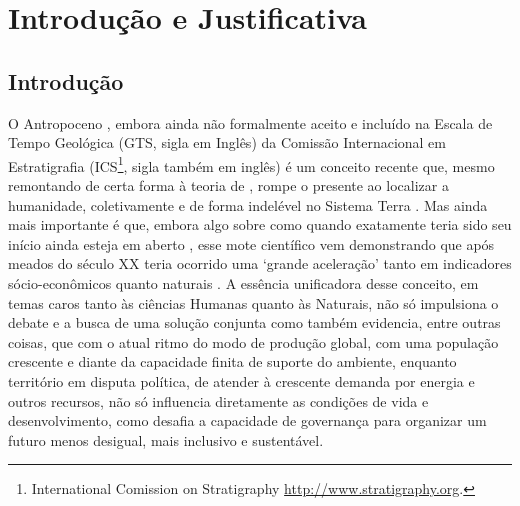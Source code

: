 \documentclass[
	12pt,				%
	openany,			%
	oneside,			%
	a4paper,			%
	english,			%
	french,				%
	spanish,			%
	brazil,				%
	]{abntex2}
\begin{document}
\textual

\chapter[Introdução]{Introdução e Justificativa}

\section{Introdução}

O Antropoceno \cite{crutzen_anthropocene_2000,crutzen_geology_2002}, embora ainda não formalmente aceito e incluído na Escala de Tempo Geológica \cite{gradstein_geologic_2005,cohen_ics_2013} (GTS, sigla em Inglês) da Comissão Internacional em Estratigrafia (ICS\footnote{International Comission on Stratigraphy \url{http://www.stratigraphy.org}.}, sigla também em inglês) é um conceito recente que, mesmo remontando de certa forma à teoria de , rompe o presente \cite{hamilton_anthropocene_2016} ao localizar a humanidade, coletivamente e de forma indelével \cite{zalasiewicz_new_2010,zalasiewicz_anthropocene:_2011} no Sistema Terra \cite{jacobson_earth_2000}. Mas ainda mais importante é que, embora algo sobre como quando exatamente teria sido seu início ainda esteja em aberto \cite{zalasiewicz_when_2015}, esse mote científico vem demonstrando que após meados do século XX teria ocorrido uma `grande aceleração' tanto em indicadores sócio-econômicos quanto naturais  \cite{steffen_anthropocene:_2011}. A essência unificadora desse conceito, em temas caros tanto às ciências Humanas quanto às Naturais, não só impulsiona o debate e a busca de uma solução conjunta como também evidencia, entre outras coisas, que com o atual ritmo do modo de produção global, com uma população crescente e diante da capacidade finita de suporte do ambiente, enquanto território em disputa política, de atender à crescente demanda por energia e outros recursos, não só influencia diretamente as condições de vida e desenvolvimento, como desafia a capacidade de governança para organizar um futuro menos desigual, mais inclusivo e sustentável.
\end{document}
